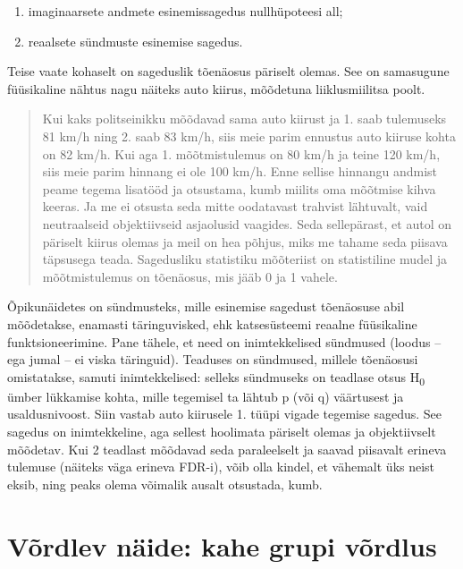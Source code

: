 \documentclass[]{book}
\begin{document}
\begin{enumerate}
\def\labelenumi{\arabic{enumi}.}
\item
  imaginaarsete andmete esinemissagedus nullhüpoteesi all;
\item
  reaalsete sündmuste esinemise sagedus.
\end{enumerate}

Teise vaate kohaselt on sageduslik tõenäosus päriselt olemas. See on
samasugune füüsikaline nähtus nagu näiteks auto kiirus, mõõdetuna
liiklusmiilitsa poolt.

\begin{quote}
Kui kaks politseinikku mõõdavad sama auto kiirust ja 1. saab tulemuseks
81 km/h ning 2. saab 83 km/h, siis meie parim ennustus auto kiiruse
kohta on 82 km/h. Kui aga 1. mõõtmistulemus on 80 km/h ja teine 120
km/h, siis meie parim hinnang ei ole 100 km/h. Enne sellise hinnangu
andmist peame tegema lisatööd ja otsustama, kumb miilits oma mõõtmise
kihva keeras. Ja me ei otsusta seda mitte oodatavast trahvist lähtuvalt,
vaid neutraalseid objektiivseid asjaolusid vaagides. Seda sellepärast,
et autol on päriselt kiirus olemas ja meil on hea põhjus, miks me tahame
seda piisava täpsusega teada. Sagedusliku statistiku mõõteriist on
statistiline mudel ja mõõtmistulemus on tõenäosus, mis jääb 0 ja 1
vahele.
\end{quote}

Õpikunäidetes on sündmusteks, mille esinemise sagedust tõenäosuse abil
mõõdetakse, enamasti täringuvisked, ehk katsesüsteemi reaalne
füüsikaline funktsioneerimine. Pane tähele, et need on inimtekkelised
sündmused (loodus -- ega jumal -- ei viska täringuid). Teaduses on
sündmused, millele tõenäosusi omistatakse, samuti inimtekkelised:
selleks sündmuseks on teadlase otsus H\textsubscript{0} ümber lükkamise
kohta, mille tegemisel ta lähtub p (või q) väärtusest ja usaldusnivoost.
Siin vastab auto kiirusele 1. tüüpi vigade tegemise sagedus. See sagedus
on inimtekkeline, aga sellest hoolimata päriselt olemas ja objektiivselt
mõõdetav. Kui 2 teadlast mõõdavad seda paraleelselt ja saavad piisavalt
erineva tulemuse (näiteks väga erineva FDR-i), võib olla kindel, et
vähemalt üks neist eksib, ning peaks olema võimalik ausalt otsustada,
kumb.

\section*{Võrdlev näide: kahe grupi
võrdlus}\label{vordlev-naide-kahe-grupi-vordlus}
\end{document}
